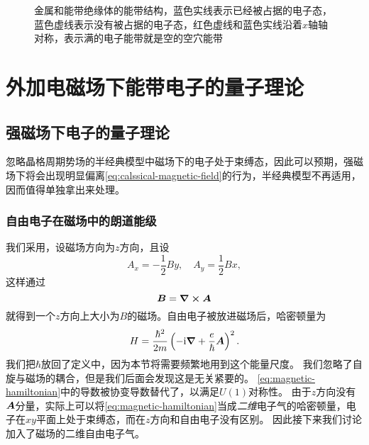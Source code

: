 \begin{figure}
    \centering
    \caption{金属和能带绝缘体的能带结构，蓝色实线表示已经被占据的电子态，蓝色虚线表示没有被占据的电子态，红色虚线和蓝色实线沿着$x$轴轴对称，表示满的电子能带就是空的空穴能带}
\end{figure}

\section{外加电磁场下能带电子的量子理论}

\subsection{强磁场下电子的量子理论}\label{sec:quantum-magnetic-field}

忽略晶格周期势场的半经典模型中磁场下的电子处于束缚态，因此可以预期，强磁场下将会出现明显偏离\eqref{eq:calssical-magnetic-field}的行为，半经典模型不再适用，因而值得单独拿出来处理。

\subsubsection{自由电子在磁场中的朗道能级}

我们采用，设磁场方向为$z$方向，且设
\begin{equation}
    A_x = - \frac{1}{2} B y, \quad A_y = \frac{1}{2} B x,
\end{equation}
这样通过
\[
    \vb*{B} = \curl{\vb*{A}}
\]
就得到一个$z$方向上大小为$B$的磁场。自由电子被放进磁场后，哈密顿量为
\begin{equation}
    {H} = \frac{\hbar^2}{2m} \left( - \mathrm{i} \grad + \frac{e}{\hbar} \vb*{A} \right)^2.
    \label{eq:magnetic-hamiltonian}
\end{equation}
我们把$\hbar$放回了定义中，因为本节将需要频繁地用到这个能量尺度。
我们忽略了自旋与磁场的耦合，但是我们后面会发现这是无关紧要的。
\eqref{eq:magnetic-hamiltonian}中的导数被协变导数替代了，以满足$U(1)$对称性。
由于$z$方向没有$\vb*{A}$分量，实际上可以将\eqref{eq:magnetic-hamiltonian}当成\emph{二维}电子气的哈密顿量，电子在$xy$平面上处于束缚态，而在$z$方向和自由电子没有区别。
因此接下来我们讨论加入了磁场的二维自由电子气。

